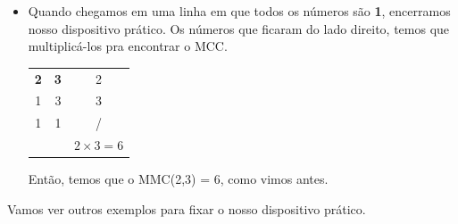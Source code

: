 \begin{itemize}
    Escrevemos o 3 do lado direito, e como 3 dividido por 3 é 1, escrevemos ele na linha de baixo.

    \item Quando chegamos em uma linha em que todos os números são \textbf{1}, encerramos nosso dispositivo prático. Os números que ficaram do lado direito, temos que multiplicá-los pra encontrar o MCC. 

    \begin{table}[H]
    \centering
    \begin{tabular}{cc|c}
        \textbf{2} & \textbf{3} & 2\\
        1 & 3 & 3\\
        1 & 1 & /\\
         &  & $2 \times 3=6$\\
    \end{tabular}
    \end{table}

    Então, temos que o MMC(2,3) = 6, como vimos antes. 
\end{itemize}

Vamos ver outros exemplos para fixar o nosso dispositivo prático.

